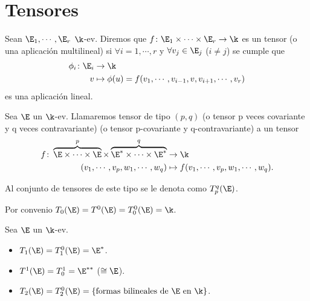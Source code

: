 
\section{Tensores}

\begin{defi}
    Sean $ \E_1,\cdots , \E_r $ $ \k $-ev.  Diremos que $ f \colon \E_1
    \times \cdots \times \E_r \to \k $ es un tensor (o una aplicación
    multilineal) si $ \forall i=1,\cdots , r $ y $ \forall v_j \in \E_j $
    ($ i \neq j $) se cumple que
    \[
        \begin{aligned}
            \phi_i \colon \E_i &\to \k \\
            v &\mapsto \phi(u)=f(v_1,\cdots , v_{i-1}, v, v_{i+1},
            \cdots , v_r)
        \end{aligned}
    \]
    es una aplicación lineal.
\end{defi}
\begin{defi}
    Sea $ \E $ un $ \k $-ev.  Llamaremos tensor de tipo $ (p,q) $ (o
    tensor p veces covariante y q veces contravariante) (o tensor
    p-covariante y q-contravariante) a un tensor
    \[
        \begin{aligned}
            f \colon \overbrace{\E \times \cdots \times \E}^p\times
            \overbrace{\E^* \times \cdots \times \E^*}^q&\to \k \\
            (v_1, \cdots, v_p, w_1, \cdots, w_q) &\mapsto f(v_1,\cdots,v_p,w_1,\cdots,w_q).
        \end{aligned}
    \]
\end{defi}
\begin{obs}
    Al conjunto de tensores de este tipo se le denota como $ T_p^q(\E) $.
\end{obs}
\begin{obs}
    Por convenio $ T_0(\E) = T^0(\E) = T_0^0(\E) = \k $.
\end{obs}
\begin{example}
    Sea $ \E $ un $ \k $-ev.
    \begin{itemize}
        \item
            $ T_1(\E) = T_1^0(\E) = \E^* $.
        \item
            $ T^1(\E) = T_0^1 = \E^{**} $ ($ \cong \E $).
        \item
            $ T_2(\E) = T_2^0(\E) = \{\text{formas bilineales de } \E
            \text{ en } \k\} $.
    \end{itemize}
\end{example}
